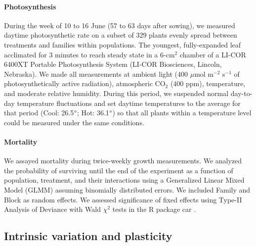 \documentclass[11pt, oneside]{article}
\newcommand{\pkg}[1]{{\fontseries{b}\selectfont #1}}
\begin{document}
\paragraph{Photosynthesis}
During the week of 10 to 16 June (57 to 63 days after sowing), we measured daytime photosynthetic rate on a subset of 329 plants evenly spread between treatments and families within populations. The youngest, fully-expanded leaf acclimated for 3 minutes to reach steady state in a 6-cm$^2$ chamber of a LI-COR 6400XT Portable Photosynthesis System (LI-COR Biosciences, Lincoln, Nebraska). We made all measurements at ambient light (400 $\mu$mol m$^{-2}$ s$^{-1}$ of photosynthetically active radiation), atmospheric CO$_2$ (400 ppm), temperature, and moderate relative humidity. During this period, we suspended normal day-to-day temperature fluctuations and set daytime temperatures to the average for that period (Cool: 26.5$\degree$; Hot: 36.1$\degree$) so that all plants within a temperature level could be measured under the same conditions.


\paragraph{Mortality}
We assayed mortality during twice-weekly growth measurements. We analyzed the probability of surviving until the end of the experiment as a function of population, treatment, and their interactions using a Generalized Linear Mixed Model (GLMM) assuming binomially distributed errors. We included Family and Block as random effects. We assessed significance of fixed effects using Type-II Analysis of Deviance with Wald $\chi ^2$ tests in the R package \pkg{car} \citep{Fox_Weisberg_2011}. 


\subsection*{Intrinsic variation and plasticity}
\end{document}
